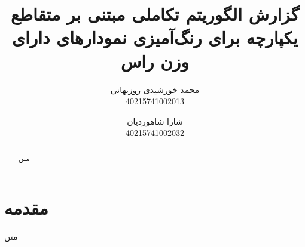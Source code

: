\documentclass[a4paper,10pt]{article}
\title{گزارش الگوریتم تکاملی مبتنی بر متقاطع یکپارچه برای رنگ‌آمیزی نمودارهای دارای وزن راس}
\author{محمد خورشیدی روزبهانی\\40215741002013 \and شارا شاهوردیان\\40215741002032}
\date{}
\begin{document}
    \maketitle

    \vspace{0.5cm}

    \begin{abstract}
        
        متن

    \end{abstract}

    \section{مقدمه}

        متن
\end{document}
